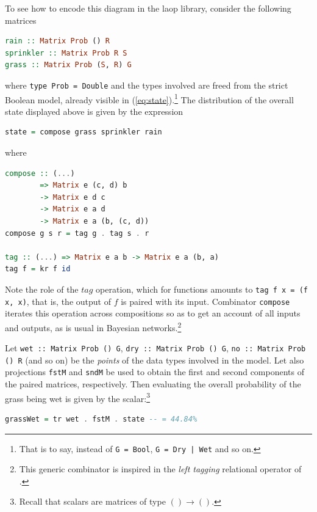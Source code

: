 \documentclass[
  oneside,
  11pt, a4paper,
  footinclude=true,
  headinclude=true,
  cleardoublepage=empty
]{scrbook}
\theoremstyle{definition}
\theoremstyle{definition}
\begin{document}
        To see how to encode this diagram in the \gls{laop} library, consider the following matrices
        \begin{lstlisting}[language=Haskell, caption={Example matrices}, captionpos=b]
rain :: Matrix Prob () R
sprinkler :: Matrix Prob R S
grass :: Matrix Prob (S, R) G
        \end{lstlisting}
        
        \noindent where \texttt{type Prob = Double} and the types involved are freed from the strict Boolean model, already visible in (\ref{eq:state}).\footnote{That is to say, instead of \texttt{G = Bool}, \texttt{G = Dry | Wet} and so on.} The distribution of the overall state displayed above is given by the expression
        \begin{lstlisting}[language=Haskell, caption={State matrix}, captionpos=b]
state = compose grass sprinkler rain
        \end{lstlisting}{}
        where
        \begin{lstlisting}[language=Haskell, caption={State matrix composition function}, captionpos=b]
compose :: (...) 
        => Matrix e (c, d) b
        -> Matrix e d c
        -> Matrix e a d
        -> Matrix e a (b, (c, d))
compose g s r = tag g . tag s . r

tag :: (...) => Matrix e a b -> Matrix e a (b, a)
tag f = kr f id
        \end{lstlisting}{}
        
        Note the role of the $tag$ operation, which for functions amounts to \texttt{tag f x = (f x, x)}, that is, the output of $f$ is paired with its input. Combinator \texttt{compose} iterates this operation across compositions so as to get an account of all inputs and outputs, as is usual in Bayesian networks.\footnote{This generic combinator is inspired in the \emph{left tagging} relational operator of \citep{Bu01}.} 
        
        Let \texttt{wet :: Matrix Prob () G}, \texttt{dry :: Matrix Prob () G}, \texttt{no :: Matrix Prob () R} (and so on) be the \emph{points} of the data types involved in the model. Let also projections \texttt{fstM} and \texttt{sndM} be used to obtain the first and second components of the paired matrices, respectively. Then evaluating the overall probability of the grass being wet is given by
        the scalar:\footnote{Recall that scalars are matrices of type \ensuremath{\mathrm{()}\to
        \mathrm{()}}.} 
        \begin{lstlisting}[language=Haskell, caption={Probability of grass being wet calculation}, captionpos=b]
grassWet = tr wet . fstM . state -- = 44.84%
        \end{lstlisting}{}
        
\end{document}
